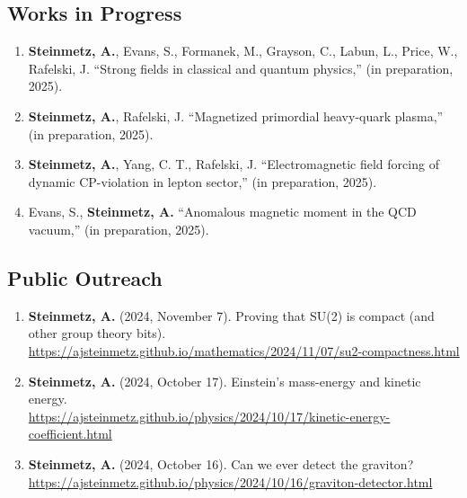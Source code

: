 \documentclass[11pt]{article}
\begin{document}
\subsection*{Works in Progress}
\begin{enumerate}[leftmargin=*,nosep]
    \item \textbf{Steinmetz, A.}, Evans, S., Formanek, M., Grayson, C., Labun, L., Price, W., Rafelski, J. ``Strong fields in classical and quantum physics,'' (in preparation, 2025).
    \item \textbf{Steinmetz, A.}, Rafelski, J. ``Magnetized primordial heavy-quark plasma,'' (in preparation, 2025).
    \item \textbf{Steinmetz, A.}, Yang, C. T., Rafelski, J. ``Electromagnetic field forcing of dynamic CP-violation in lepton sector,'' (in preparation, 2025).
    \item Evans, S., \textbf{Steinmetz, A.} ``Anomalous magnetic moment in the QCD vacuum,'' (in preparation, 2025).
\end{enumerate}

\subsection*{Public Outreach}
\begin{enumerate}[leftmargin=*,nosep]
    \item \textbf{Steinmetz, A.} (2024, November 7). Proving that SU(2) is compact (and other group theory bits). \href{https://ajsteinmetz.github.io/mathematics/2024/11/07/su2-compactness.html}{https://ajsteinmetz.github.io/mathematics/2024/11/07/su2-compactness.html}
    \item \textbf{Steinmetz, A.} (2024, October 17). Einstein’s mass-energy and kinetic energy. \\ \href{https://ajsteinmetz.github.io/physics/2024/10/17/kinetic-energy-coefficient.html}{https://ajsteinmetz.github.io/physics/2024/10/17/kinetic-energy-coefficient.html}
    \item \textbf{Steinmetz, A.} (2024, October 16). Can we ever detect the graviton?\\ \href{https://ajsteinmetz.github.io/physics/2024/10/16/graviton-detector.html}{https://ajsteinmetz.github.io/physics/2024/10/16/graviton-detector.html}
\end{enumerate}
\end{document}
